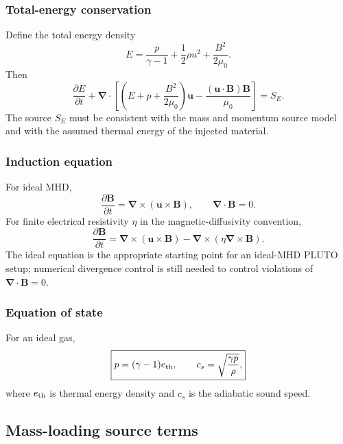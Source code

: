 \documentclass[11pt,a4paper]{article}
\newcommand{\Div}{\boldsymbol{\nabla}\!\cdot}
\newcommand{\Curl}{\boldsymbol{\nabla}\!\times}
\newcommand{\uvec}{\boldsymbol{u}}
\newcommand{\Bvec}{\boldsymbol{B}}
\newcommand{\rhov}{\rho}
\begin{document}
\subsubsection{Total-energy conservation}
Define the total energy density
\begin{equation}
E=\frac{p}{\gamma-1}+\frac{1}{2}\rhov u^2+\frac{B^2}{2\mu_0}.
\label{eq:total-energy}
\end{equation}
Then
\begin{equation}
\boxed{\frac{\partial E}{\partial t}+
\Div\left[\left(E+p+\frac{B^2}{2\mu_0}\right)\uvec
-\frac{(\uvec\cdot\Bvec)\Bvec}{\mu_0}\right]=S_E.}
\label{eq:mhd-energy}
\end{equation}
The source $S_E$ must be consistent with the mass and momentum source model and with the assumed thermal energy of the injected material.
\subsubsection{Induction equation}
For ideal MHD,
\begin{equation}
\boxed{\frac{\partial\Bvec}{\partial t}=\Curl(\uvec\times\Bvec),\qquad \Div\Bvec=0.}
\label{eq:induction-ideal}
\end{equation}
For finite electrical resistivity $\eta$ in the magnetic-diffusivity convention,
\begin{equation}
\frac{\partial\Bvec}{\partial t}=\Curl(\uvec\times\Bvec)-\Curl(\eta\Curl\Bvec).
\label{eq:induction-resistive}
\end{equation}
The ideal equation is the appropriate starting point for an ideal-MHD PLUTO setup; numerical divergence control is still needed to control violations of $\Div\Bvec=0$.
\subsubsection{Equation of state}
For an ideal gas,
\begin{equation}
\boxed{p=(\gamma-1)e_{\rm th},\qquad c_s=\sqrt{\frac{\gamma p}{\rhov}},}
\label{eq:eos}
\end{equation}
where $e_{\rm th}$ is thermal energy density and $c_s$ is the adiabatic sound speed.

\subsection{Mass-loading source terms}
\end{document}
